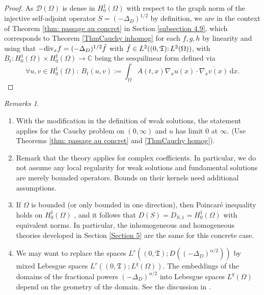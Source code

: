 \documentclass[11pt, letterpaper]{amsart}
\theoremstyle{definition}
\theoremstyle{remark}
\newtheorem{rems}[thm]{Remarks}
\numberwithin{equation}{section}
\begin{document}
\begin{proof}
{As $\mathcal{D}(\Omega)$ is dense in $H^1_0(\Omega)$ with respect to the graph norm of the injective self-adjoint operator $S=(-\Delta_D)^{1/2}$ by definition, we are in the context of Theorem \ref{thm: passage au concret} in Section \ref{subsection 4.9}, which corresponds to Theorem \ref{ThmCauchy inhomog} for each $f,g,h$ by linearity and using that $-\mathrm{div}_x{f} =(-\Delta_D)^{1/2} \Tilde{f}$ with $\Tilde{f}\in L^2((0,\mathfrak{T}); L^2(\Omega))$, with $B_t : H^1_0(\Omega) \times H^1_0(\Omega) \rightarrow \mathbb{C}$ being the sesquilinear form defined via
\begin{equation*}
   \forall u,v \in H^1_0(\Omega) : \  B_t(u,v) :=  \int_{\Omega} A(t,x)\nabla_x u(x) \cdot \overline{\nabla_x v(x)} \, \mathrm{d} x.
\end{equation*}
}
 
\end{proof}

\begin{rems}
    \begin{enumerate}
        \item With the modification in the definition of weak solutions, the statement applies for  the Cauchy problem on $(0,\infty)$ and $u$ has limit 0 at $\infty$. (Use Theorems \ref{thm: passage au concret} and \ref{ThmCauchy homog}).
        \item Remark that the theory applies for complex coefficients. In particular, we do not assume any local regularity for weak solutions and fundamental solutions are merely bounded operators. Bounds on their kernels need additional assumptions. 
        \item If $\Omega$ is bounded (or only bounded in one direction), then  Poincar\'e inequality holds on $H^1_0(\Omega)$ \cite[Proposition 3.25]{egert2024harmonic}, and it follows that  $D(S)=D_{S,1}=H^1_0(\Omega)$ with equivalent norms. In particular, the inhomogeneous and homogeneous theories developed in Section \ref{Section 5} are the same for this concrete case.
        \item We may want to replace the spaces $L^r((0,\mathfrak{T});D((-\Delta_D)^{\alpha/2}))$ by mixed Lebesgue spaces $L^r((0,\mathfrak{T});L^q(\Omega))$.  The embeddings of the domains of the fractional powers $(-\Delta_D)^{\alpha/2}$  into Lebesgue spaces $L^q(\Omega)$ depend on the geometry of the domain. See the discussion in \cite{auscher2023universal}.
    \end{enumerate}
\end{rems}
\end{document}
